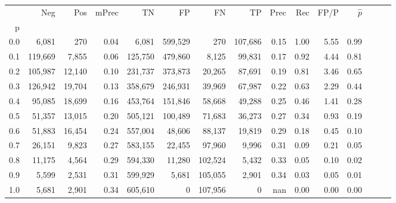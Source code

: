 \begin{tabular}{rrrrrrrrrrrrrrr}
\toprule
{} &      Neg &     Pos & mPrec &       TN &       FP &       FN &       TP &  Prec &   Rec &  FP/P & $\hat{p}$ \\
p   &          &         &       &          &          &          &          &       &       &       &           \\
\midrule
0.0 &    6,081 &     270 &  0.04 &    6,081 &  599,529 &      270 &  107,686 &  0.15 &  1.00 &  5.55 &      0.99 \\
0.1 &  119,669 &   7,855 &  0.06 &  125,750 &  479,860 &    8,125 &   99,831 &  0.17 &  0.92 &  4.44 &      0.81 \\
0.2 &  105,987 &  12,140 &  0.10 &  231,737 &  373,873 &   20,265 &   87,691 &  0.19 &  0.81 &  3.46 &      0.65 \\
0.3 &  126,942 &  19,704 &  0.13 &  358,679 &  246,931 &   39,969 &   67,987 &  0.22 &  0.63 &  2.29 &      0.44 \\
0.4 &   95,085 &  18,699 &  0.16 &  453,764 &  151,846 &   58,668 &   49,288 &  0.25 &  0.46 &  1.41 &      0.28 \\
0.5 &   51,357 &  13,015 &  0.20 &  505,121 &  100,489 &   71,683 &   36,273 &  0.27 &  0.34 &  0.93 &      0.19 \\
0.6 &   51,883 &  16,454 &  0.24 &  557,004 &   48,606 &   88,137 &   19,819 &  0.29 &  0.18 &  0.45 &      0.10 \\
0.7 &   26,151 &   9,823 &  0.27 &  583,155 &   22,455 &   97,960 &    9,996 &  0.31 &  0.09 &  0.21 &      0.05 \\
0.8 &   11,175 &   4,564 &  0.29 &  594,330 &   11,280 &  102,524 &    5,432 &  0.33 &  0.05 &  0.10 &      0.02 \\
0.9 &    5,599 &   2,531 &  0.31 &  599,929 &    5,681 &  105,055 &    2,901 &  0.34 &  0.03 &  0.05 &      0.01 \\
1.0 &    5,681 &   2,901 &  0.34 &  605,610 &        0 &  107,956 &        0 &   nan &  0.00 &  0.00 &      0.00 \\
\bottomrule
\end{tabular}

